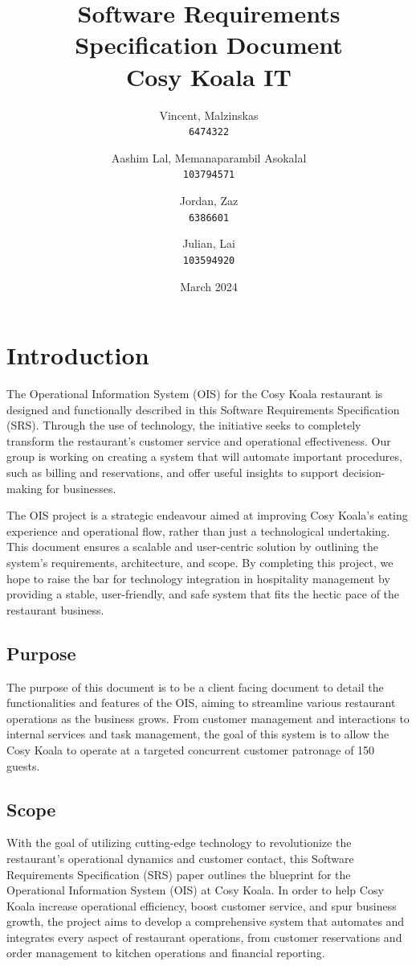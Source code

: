 \documentclass{article}
\title{Software Requirements Specification
Document\\
Cosy Koala IT}
\author{
  Vincent, Malzinskas\\
  \texttt{6474322}
  \and
  Aashim Lal, Memanaparambil Asokalal\\
  \texttt{103794571}
  \and
  Jordan, Zaz\\
  \texttt{6386601}
  \and
  Julian, Lai\\
  \texttt{103594920}
}
\date{March 2024}
\begin{document}
\maketitle
\newpage
\tableofcontents
\newpage

\clearpage
\section{Introduction}
The Operational Information System (OIS) for the Cosy Koala restaurant is designed and functionally described in this Software Requirements Specification (SRS). Through the use of technology, the initiative seeks to completely transform the restaurant's customer service and operational effectiveness. Our group is working on creating a system that will automate important procedures, such as billing and reservations, and offer useful insights to support decision-making for businesses.

The OIS project is a strategic endeavour aimed at improving Cosy Koala's eating experience and operational flow, rather than just a technological undertaking. This document ensures a scalable and user-centric solution by outlining the system's requirements, architecture, and scope. By completing this project, we hope to raise the bar for technology integration in hospitality management by providing a stable, user-friendly, and safe system that fits the hectic pace of the restaurant business.



\subsection{Purpose}
The purpose of this document is to be a client facing document to detail the functionalities and features of the OIS, aiming to streamline various restaurant operations as the business grows. From customer management  and interactions to internal services and task management, the goal of this system is to allow the Cosy Koala to operate at a targeted concurrent customer patronage of 150 guests.

\subsection{Scope}

With the goal of utilizing cutting-edge technology to revolutionize the restaurant's operational dynamics and customer contact, this Software Requirements Specification (SRS) paper outlines the blueprint for the Operational Information System (OIS) at Cosy Koala. In order to help Cosy Koala increase operational efficiency, boost customer service, and spur business growth, the project aims to develop a comprehensive system that automates and integrates every aspect of restaurant operations, from customer reservations and order management to kitchen operations and financial reporting.
\end{document}
